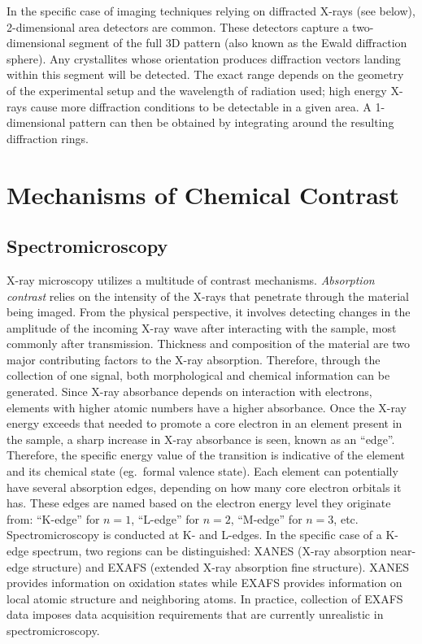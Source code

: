 \documentclass[journal=cmatex,manuscript=perspective]{achemso}
\begin{document}
In the specific case of imaging techniques relying on diffracted
X-rays (see below), 2-dimensional area detectors are common. These
detectors capture a two-dimensional segment of the full 3D pattern
(also known as the Ewald diffraction sphere). Any crystallites whose
orientation produces diffraction vectors landing within this segment
will be detected. The exact range depends on the geometry of the
experimental setup and the wavelength of radiation used; high energy
X-rays cause more diffraction conditions to be detectable in a given
area. A 1-dimensional pattern can then be obtained by integrating
around the resulting diffraction rings.


\section{Mechanisms of Chemical Contrast}


\subsection{Spectromicroscopy}

X-ray microscopy utilizes a multitude of contrast
mechanisms. \emph{Absorption contrast} relies on the intensity of the
X-rays that penetrate through the material being imaged. From the
physical perspective, it involves detecting changes in the amplitude
of the incoming X-ray wave after interacting with the sample, most
commonly after transmission. Thickness and composition of the material
are two major contributing factors to the X-ray absorption. Therefore,
through the collection of one signal, both morphological and chemical
information can be generated. Since X-ray absorbance depends on
interaction with electrons, elements with higher atomic numbers have a
higher absorbance. Once the X-ray energy exceeds that needed to
promote a core electron in an element present in the sample, a sharp
increase in X-ray absorbance is seen, known as an ``edge''. Therefore,
the specific energy value of the transition is indicative of the
element and its chemical state (eg.\ formal valence state). Each
element can potentially have several absorption edges, depending on
how many core electron orbitals it has. These edges are named based on
the electron energy level they originate from: ``K-edge'' for $n=1$,
``L-edge'' for $n=2$, ``M-edge'' for $n=3$, etc. Spectromicroscopy is
conducted at K- and L-edges. In the specific case of a K-edge
spectrum, two regions can be distinguished: XANES (X-ray absorption
near-edge structure) and EXAFS (extended X-ray absorption fine
structure). XANES provides information on oxidation states while EXAFS
provides information on local atomic structure and neighboring
atoms. In practice, collection of EXAFS data imposes data acquisition
requirements that are currently unrealistic in spectromicroscopy.
\end{document}
